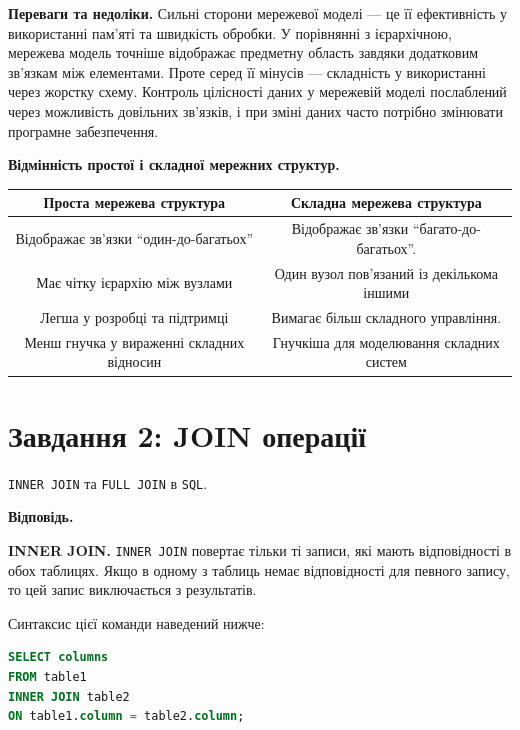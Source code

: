 \documentclass{hw_template}
\begin{document}
\textbf{Переваги та недоліки.} Сильні сторони мережевої моделі — це її ефективність у використанні пам'яті та
швидкість обробки. У порівнянні з ієрархічною, мережева модель точніше
відображає предметну область завдяки додатковим зв’язкам між елементами. Проте
серед її мінусів — складність у використанні через жорстку схему. Контроль
цілісності даних у мережевій моделі послаблений через можливість довільних
зв’язків, і при зміні даних часто потрібно змінювати програмне забезпечення. 

\textbf{Відмінність простої і складної мережних структур.} 
\begin{table}[H]
    \centering
    \begin{tabular}{|c|c|}
        \hline
        \textbf{Проста мережева структура} & \textbf{Складна мережева структура} \\
        \hline
        Відображає зв'язки ``один-до-багатьох'' & Відображає зв'язки ``багато-до-багатьох''. \\
        Має чітку ієрархію між вузлами & Один вузол пов'язаний із декількома іншими \\
        Легша у розробці та підтримці & Вимагає більш складного управління. \\
        Менш гнучка у вираженні складних відносин & Гнучкіша для моделювання складних систем \\
        \hline
    \end{tabular}
\end{table}

\newpage

\section{Завдання 2: JOIN операції}

\begin{problem}
    \texttt{INNER JOIN} та \texttt{FULL JOIN} в \texttt{SQL}.
\end{problem}

\textbf{Відповідь.} 

\textbf{INNER JOIN.} \texttt{INNER JOIN} повертає тільки ті записи, які мають
відповідності в обох таблицях. Якщо в одному з таблиць немає відповідності для
певного запису, то цей запис виключається з результатів.

Синтаксис цієї команди наведений нижче:
\begin{lstlisting}[language=SQL]
SELECT columns
FROM table1
INNER JOIN table2
ON table1.column = table2.column;    
\end{lstlisting}
\end{document}
